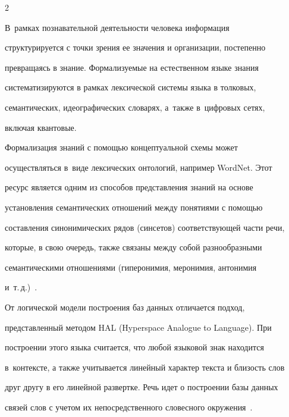 \begin{multicols}{2}





\label{st\stat}


     


    В~рамках познавательной дея\-тель\-ности человека информация 


структурируется с точ\-ки зрения ее значения и организации, постепенно 


пре\-вра\-ща\-ясь в знание. Фор\-ма\-ли\-зу\-емые на естественном языке знания 


систематизируются в рамках лексической сис\-те\-мы языка в толковых, 


семантических, идеографических словарях, а~так\-же в~циф\-ро\-вых сетях, 


вклю\-чая квантовые.


    


    Формализация знаний с по\-мощью концептуальной схемы может 


осуществляться в~виде лексических онтологий, например WordNet. Этот 


ресурс является одним из способов пред\-став\-ле\-ния знаний на основе 


установления семантических отношений меж\-ду понятиями с по\-мощью 


составления синонимических рядов (синсетов) со\-от\-вет\-ст\-ву\-ющей час\-ти речи, 


которые, в свою очередь, так\-же связаны меж\-ду собой разнообразными 


семантическими отношениями (гиперонимия, меронимия, антонимия 


и~т.\,д.)~\cite{4-an}.


    


    От логической модели построения баз данных отличается подход, 


представленный методом HAL (Hyperspace Analogue to Language). При 


построении этого языка считается, что любой языковой знак находится 


в~контексте, а также учитывается линейный характер текста и бли\-зость слов 


друг другу в его линейной развертке. Речь идет о построении базы данных 


связей слов с учетом их непосредственного словесного окружения~\cite{5-an}. 



\end{multicols}
